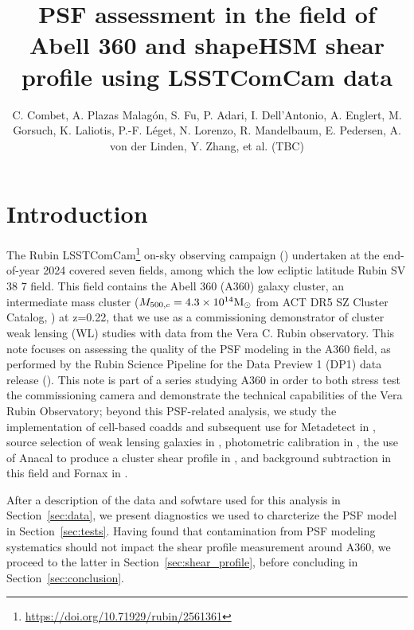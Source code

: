 \documentclass[SE,lsstdraft,authoryear,toc]{lsstdoc}
\title{PSF assessment in the field of Abell 360 and shapeHSM shear profile using LSSTComCam data}
\author{%
C. Combet, A. Plazas Malagón, S. Fu, P. Adari, I. Dell'Antonio, A. Englert, M. Gorsuch, K. Laliotis, P.-F. Léget, N. Lorenzo, R. Mandelbaum, E. Pedersen, A. von der Linden, Y. Zhang, et al. (TBC)
}
\date{\vcsDate}
\begin{document}
\maketitle

\section{Introduction}
The Rubin LSSTComCam\footnote{\url{https://doi.org/10.71929/rubin/2561361}} on-sky observing campaign ()
undertaken at the end-of-year 2024 covered seven fields, among which the low ecliptic latitude Rubin SV 38 7 field. This field contains the Abell 360 (A360) galaxy cluster, an intermediate mass cluster ($M_{500,c} = 4.3\times 10^{14} \rm{M}_\odot$ from ACT DR5 SZ Cluster Catalog, \citealp{2021ApJS..253....3H}) at z=0.22, that we use as a commissioning demonstrator of cluster weak lensing (WL) studies with data from the Vera C. Rubin observatory. This note focuses on assessing the quality of the PSF modeling in the A360 field, as performed by the Rubin Science Pipeline for the Data Preview 1 (DP1) data release (). This note is part of a series studying A360 in order to both stress test the commissioning camera and demonstrate the technical capabilities of the Vera Rubin Observatory; beyond this PSF-related analysis, we study the implementation of cell-based coadds and subsequent use for Metadetect in , source selection of weak lensing galaxies in , photometric calibration in \cite{}, the use of Anacal to produce a cluster shear profile in , and background subtraction in this field and Fornax in \cite{}.




After a description of the data and sofwtare used for this analysis in Section~\ref{sec:data}, we present diagnostics we used to charcterize the PSF model in Section~\ref{sec:tests}. Having found that contamination from PSF modeling systematics should not impact the shear profile measurement around A360, we proceed to the latter in Section~\ref{sec:shear_profile}, before concluding in Section~\ref{sec:conclusion}.
\end{document}

